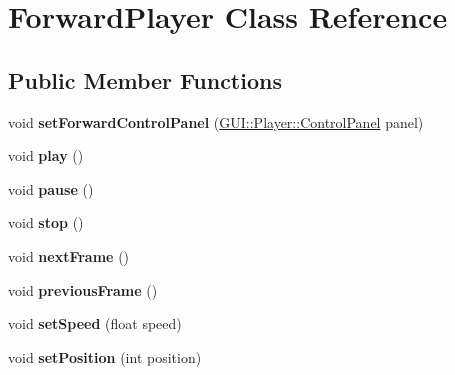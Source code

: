 \hypertarget{classGUI_1_1ForwardPlayer}{}\section{Forward\+Player Class Reference}
\label{classGUI_1_1ForwardPlayer}
\subsection*{Public Member Functions}
\begin{DoxyCompactItemize}
\item 
\hypertarget{classGUI_1_1ForwardPlayer_a197c17c5b8dc04f8c311b41763a9db0e}{}void {\bfseries set\+Forward\+Control\+Panel} (\hyperlink{classGUI_1_1Player_1_1ControlPanel}{G\+U\+I\+::\+Player\+::\+Control\+Panel} panel)\label{classGUI_1_1ForwardPlayer_a197c17c5b8dc04f8c311b41763a9db0e}

\item 
\hypertarget{classGUI_1_1ForwardPlayer_a6d58098c6cf63c241ed03bc797256bb1}{}void {\bfseries play} ()\label{classGUI_1_1ForwardPlayer_a6d58098c6cf63c241ed03bc797256bb1}

\item 
\hypertarget{classGUI_1_1ForwardPlayer_a7167f5c196fc5e167bfabde1a730e81d}{}void {\bfseries pause} ()\label{classGUI_1_1ForwardPlayer_a7167f5c196fc5e167bfabde1a730e81d}

\item 
\hypertarget{classGUI_1_1ForwardPlayer_a8c528baf37154d347366083f0f816846}{}void {\bfseries stop} ()\label{classGUI_1_1ForwardPlayer_a8c528baf37154d347366083f0f816846}

\item 
\hypertarget{classGUI_1_1ForwardPlayer_a365329da56f8b07f8c95027ba967bbc3}{}void {\bfseries next\+Frame} ()\label{classGUI_1_1ForwardPlayer_a365329da56f8b07f8c95027ba967bbc3}

\item 
\hypertarget{classGUI_1_1ForwardPlayer_a3c96ed37c70ebc0b32c527a04e1536d1}{}void {\bfseries previous\+Frame} ()\label{classGUI_1_1ForwardPlayer_a3c96ed37c70ebc0b32c527a04e1536d1}

\item 
\hypertarget{classGUI_1_1ForwardPlayer_a5466c67c5ec22359c0702dc4ac8ffb19}{}void {\bfseries set\+Speed} (float speed)\label{classGUI_1_1ForwardPlayer_a5466c67c5ec22359c0702dc4ac8ffb19}

\item 
\hypertarget{classGUI_1_1ForwardPlayer_a1aa68f77243229daea38d59bc5145d35}{}void {\bfseries set\+Position} (int position)\label{classGUI_1_1ForwardPlayer_a1aa68f77243229daea38d59bc5145d35}


\end{DoxyCompactItemize}

